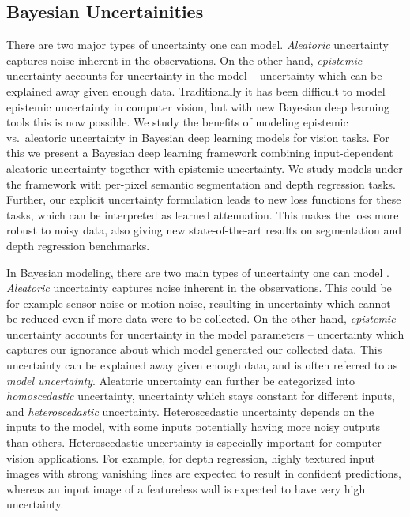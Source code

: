 \subsection{Bayesian Uncertainities}

There are two major types of uncertainty one can model. \textit{Aleatoric} uncertainty captures noise inherent in the observations. On the other hand, \textit{epistemic} uncertainty accounts for uncertainty in the model -- uncertainty which can be explained away given enough data. Traditionally it has been difficult to model epistemic uncertainty in computer vision, but with new Bayesian deep learning tools this is now possible.
We study the benefits of modeling epistemic vs.\ aleatoric uncertainty in Bayesian deep learning models for vision tasks. For this we present a Bayesian deep learning framework combining input-dependent aleatoric uncertainty together with epistemic uncertainty. We study models under the framework with per-pixel semantic segmentation and depth regression tasks. Further, our explicit uncertainty formulation leads to new loss functions for these tasks, which can be interpreted as learned attenuation. This makes the loss more robust to noisy data, also giving new state-of-the-art results on segmentation and depth regression benchmarks. 

In Bayesian modeling, there are two main types of uncertainty one can model \citep{der2009aleatory}. \textit{Aleatoric} uncertainty captures noise inherent in the observations.
This could be for example sensor noise or motion noise, resulting in uncertainty which cannot be reduced even if more data were to be collected.
On the other hand, \textit{epistemic} uncertainty accounts for uncertainty in the model parameters -- uncertainty which captures our ignorance about which model generated our collected data. 
This uncertainty can be explained away given enough data, and is often referred to as \textit{model uncertainty}. Aleatoric uncertainty can further be categorized into \textit{homoscedastic} uncertainty, uncertainty which stays constant for different inputs, and \textit{heteroscedastic} uncertainty. Heteroscedastic uncertainty depends on the inputs to the model, with some inputs potentially having more noisy outputs than others. 
Heteroscedastic uncertainty is especially important for computer vision applications. For example, for depth regression, highly textured input images with strong vanishing lines are expected to result in confident predictions, whereas an input image of a featureless wall is expected to have very high uncertainty.


